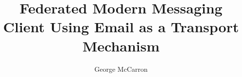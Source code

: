 \documentclass[a4paper,12pt,oneside]{report}
\begin{document}
\title{Federated Modern Messaging Client Using Email as a Transport Mechanism}

\author{George McCarron}

\normallinespacing
\maketitle


\preface
\clearpage
{}




\body








\clearpage
{}
{}


\narrowlinespacing




%
\end{document}
